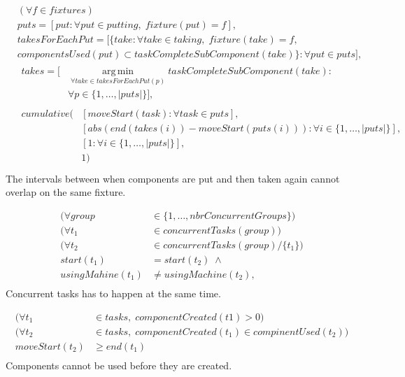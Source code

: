  \begin{equation}
 \begin{aligned}\label{eq:100}
 &(\forall f \in fixtures) \\
 &puts = [put : \forall put \in putting, \; fixture(put) = f], \\
 &takesForEachPut = [\{take : \forall take \in taking, \; fixture(take) = f, \\
 &componentsUsed(put) \subset taskCompleteSubComponent(take)\} : \forall put \in puts], \\
 &\begin{aligned}
 takes = [&\operatorname*{arg\,min}_{\forall take \in takesForEachPut(p)}{taskCompleteSubComponent(take)} : \\
 &\forall p \in \{1 , \ldots , |puts|\}], 
 \end{aligned}\\
 &\begin{aligned}
 cumulative(&[moveStart(task) : \forall task \in puts], \\ &[abs(end(takes(i))-moveStart(puts(i))) : \forall i \in \{1 , \ldots , |puts|\}], \\
 &[1 : \forall i \in \{1 , \ldots , |puts|\}],\\
 &1)
 \end{aligned}\\
 \end{aligned}
 \end{equation}
 The intervals between when components are put and then taken again cannot overlap on the same fixture.
 
 \begin{equation}
 \begin{aligned}\label{eq:101}
 (\forall group &\in \{1 , \ldots , nbrConcurrentGroups\}) \\
 (\forall t_1 &\in concurrentTasks(group)) \\
 (\forall t_2 &\in concurrentTasks(group) / \{t_1\}) \\
 start(t_1) &= start(t_2) \; \land \\
 usingMahine(t_1) &\neq usingMachine(t_2), \\
 \end{aligned}
 \end{equation}
 Concurrent tasks has to happen at the same time.
 
 \begin{equation}
 \begin{aligned}\label{eq:102}
 (\forall t_1 &\in tasks, \; componentCreated(t1) > 0) \\
 (\forall t_2 &\in tasks, \; componentCreated(t_1) \in compinentUsed(t_2)) \\
 moveStart(t_2) &\geq end(t_1) \\
 \end{aligned}
 \end{equation}
 Components cannot be used before they are created.
 
